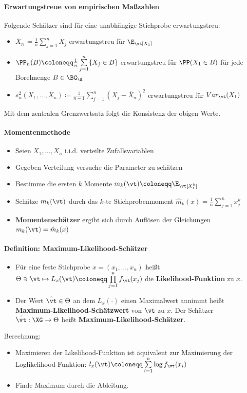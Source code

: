 \paragraph{Erwartungstreue von empirischen Maßzahlen}
Folgende Schätzer sind für eine unabhängige Stichprobe erwartungstreu:
\begin{itemize}
	\item $\overline{X}_n\coloneqq\frac{1}{n}\sum\limits_{j=1}^{n}X_j$ erwartungstreu für $\E_\vt[X_1]$
	\item $\PP_n(B)\coloneqq\frac{1}{n}\sum\limits_{j=1}^{n}\{X_j\in B\}$ erwartungstreu für $\PP(X_1\in B)$ für jede Borelmenge $B\in\BG_\R$
	\item $s_n^2(X_1,\ldots,X_n)\coloneqq\frac{1}{n-1}\sum\limits_{j=1}^{n}(X_j-\overline{X}_n)^2$ erwartungstreu für $Var_\vt(X_1)$
\end{itemize}
Mit dem zentralen Grenzwertsatz folgt die Konsistenz der obigen Werte.

\paragraph{Momentenmethode}
\begin{itemize}
	\item Seien $X_1,\ldots,X_n$ i.i.d. verteilte Zufallsvariablen
	\item Gegeben Verteilung versuche die Parameter zu schätzen
	\item Bestimme die ersten $k$ Momente $m_k(\vt)\coloneqq\E_\vt[X_1^k]$
	\item Schätze $m_k(\vt)$ durch das $k$-te Stichprobenmoment $\hat{m}_k(x)=\frac{1}{n}\sum\limits_{j=1}^{n}x_j^k$
	\item \textbf{Momentenschätzer} ergibt sich durch Auflösen der Gleichungen $m_k(\vt)=\hat{m}_k(x)$
\end{itemize}

\paragraph{Definition: Maximum-Likelihood-Schätzer}
\begin{itemize}
	\item Für eine feste Stichprobe $x=(x_1,\ldots,x_n)$ heißt $\Theta\ni\vt\mapsto L_x(\vt)\coloneqq\prod\limits_{j=1}^{n}f_\vt(x_j)$ die \textbf{Likelihood-Funktion} zu $x$.
	\item Der Wert $\hat{\vt}\in\Theta$ an dem $L_x(\cdot)$ einen Maximalwert annimmt heißt \textbf{Maximum-Likelihood-Schätzwert} von $\vt$ zu $x$. Der Schätzer $\hat{\vt}:\XG\rightarrow\Theta$ heißt \textbf{Maximum-Likelihood-Schätzer}.
\end{itemize}
Berechnung:
\begin{itemize}
	\item Maximieren der Likelihood-Funktion ist äquivalent zur Maximierung der Loglikelihood-Funktion: $l_x(\vt)\coloneqq\sum\limits_{i=1}^n\log f_\vt(x_i)$
	\item Finde Maximum durch die Ableitung.
\end{itemize}
